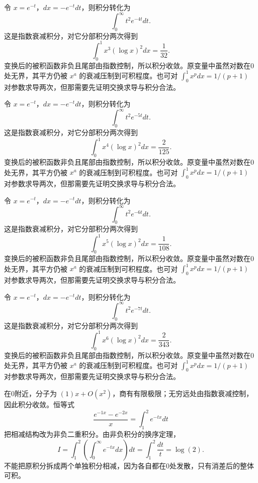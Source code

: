 \documentclass[12pt,fontset=fandol]{ctexart}
\begin{document}
\begin{solve}\label{ans:c20q9}
令 $x=e^{-t}$，$dx=-e^{-t}dt$，则积分转化为
\[
\int_0^\infty t^2e^{-4t}dt.
\]
这是指数衰减积分，对它分部积分两次得到
\[
\int_0^1x^{3}(\log x)^2dx=\frac{1}{32}.
\]
变换后的被积函数非负且尾部由指数控制，所以积分收敛。原变量中虽然对数在0处无界，其平方仍被 $x^a$ 的衰减压制到可积程度。也可对 $\int_0^1x^pdx=1/(p+1)$ 对参数求导两次，但那需要先证明交换求导与积分合法。
\end{solve}

\begin{solve}\label{ans:c20q10}
令 $x=e^{-t}$，$dx=-e^{-t}dt$，则积分转化为
\[
\int_0^\infty t^2e^{-5t}dt.
\]
这是指数衰减积分，对它分部积分两次得到
\[
\int_0^1x^{4}(\log x)^2dx=\frac{2}{125}.
\]
变换后的被积函数非负且尾部由指数控制，所以积分收敛。原变量中虽然对数在0处无界，其平方仍被 $x^a$ 的衰减压制到可积程度。也可对 $\int_0^1x^pdx=1/(p+1)$ 对参数求导两次，但那需要先证明交换求导与积分合法。
\end{solve}

\begin{solve}\label{ans:c20q11}
令 $x=e^{-t}$，$dx=-e^{-t}dt$，则积分转化为
\[
\int_0^\infty t^2e^{-6t}dt.
\]
这是指数衰减积分，对它分部积分两次得到
\[
\int_0^1x^{5}(\log x)^2dx=\frac{1}{108}.
\]
变换后的被积函数非负且尾部由指数控制，所以积分收敛。原变量中虽然对数在0处无界，其平方仍被 $x^a$ 的衰减压制到可积程度。也可对 $\int_0^1x^pdx=1/(p+1)$ 对参数求导两次，但那需要先证明交换求导与积分合法。
\end{solve}

\begin{solve}\label{ans:c20q12}
令 $x=e^{-t}$，$dx=-e^{-t}dt$，则积分转化为
\[
\int_0^\infty t^2e^{-7t}dt.
\]
这是指数衰减积分，对它分部积分两次得到
\[
\int_0^1x^{6}(\log x)^2dx=\frac{2}{343}.
\]
变换后的被积函数非负且尾部由指数控制，所以积分收敛。原变量中虽然对数在0处无界，其平方仍被 $x^a$ 的衰减压制到可积程度。也可对 $\int_0^1x^pdx=1/(p+1)$ 对参数求导两次，但那需要先证明交换求导与积分合法。
\end{solve}

\begin{solve}\label{ans:c20q13}
在0附近，分子为 $(1)x+O(x^2)$，商有有限极限；无穷远处由指数衰减控制，因此积分收敛。恒等式
\[
\frac{e^{-1x}-e^{-2x}}x=\int_{1}^{2}e^{-tx}dt
\]
把相减结构改为非负二重积分。由非负积分的换序定理，
\[
I=\int_{1}^{2}\left(\int_0^\infty e^{-tx}dx\right)dt=\int_{1}^{2}\frac{dt}t=\log(2).
\]
不能把原积分拆成两个单独积分相减，因为各自都在0处发散，只有消差后的整体可积。
\end{solve}
\end{document}
